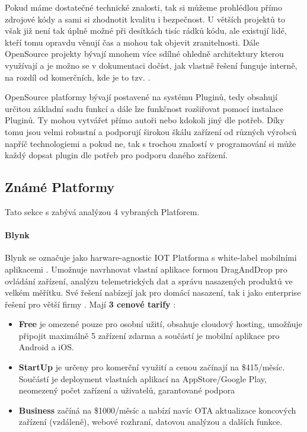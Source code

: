 Pokud máme dostatečné technické znalosti, tak si můžeme prohlédlou přímo zdrojové kódy a sami si zhodnotit kvalitu i bezpečnost. U větších projektů to však již není tak úplně možné při desítkách tisíc rádků kódu, ale existují lidé, kteří tomu opravdu věnují čas a mohou tak objevit zranitelnosti. Dále OpenSource projekty bývají mnohem více sdílné ohledně architektury kterou využívají a je možno se v dokumentaci dočíst, jak vlastně řešení funguje interně, na rozdíl od komerčních, kde je to tzv. .

OpenSource platformy bývají postavené na systému Pluginů, tedy obsahují určitou základní sadu funkcí a dále lze funkčnost rozšiřovat pomocí instalace Pluginů. Ty mohou vytvářet přímo autoři nebo kdokoli jiný dle potřeb. Díky tomu jsou velmi robustní a podporují širokou škálu zařízení od různých výrobců napříč technologiemi a pokud ne, tak s trochou znalostí v programování si může každý dopsat plugin dle potřeb pro podporu daného zařízení.


\subsection{Známé Platformy}
Tato sekce s zabývá analýzou 4 vybraných Platforem.

\paragraph{Blynk}
Blynk se označuje jako harware-agnostic IOT Platforma s white-label mobilními aplikacemi \cite{blynk}. Umožnuje navrhnovat vlastní aplikace formou DragAndDrop pro ovládání zařízení, analýzu telemetrických dat a správu nasazených produktů ve velkém měřítku. Své řešení nabízejí jak pro domácí nasazení, tak i jako enterprise řešení pro větší firmy \cite{blynk}. Mají \textbf{3 cenové tarify} \cite{blynk-pricing}:
\begin{itemize}
    \item \textbf{Free} je omezené pouze pro osobní užití, obsahuje cloudový hosting, umožňuje připojit maximálně 5 zařízení zdarma a součástí je mobilní aplikace pro Android a iOS.
    \item \textbf{StartUp} je určeny pro komerční využití a cenou začínají na \$415/měsíc. Součástí je deployment vlastních aplikací na AppStore/Google Play, neomezený počet zařízení a uživatelů, garantované podpora
    \item \textbf{Business} začíná na \$1000/měsíc a nabízí navíc OTA aktualizace koncových zařízení (vzdáleně), webové rozhraní, datovou analýzou a dalších funkce.
\end{itemize}

